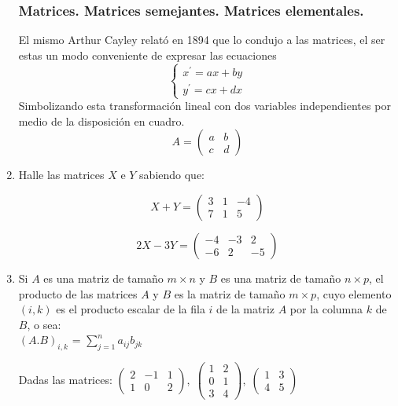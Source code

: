\begin{enumerate}
\subsubsection{Matrices. Matrices semejantes. Matrices elementales.}

 \bigskip
 
 El mismo Arthur Cayley relató en 1894 que lo condujo a las matrices, el ser estas un modo conveniente de expresar las ecuaciones
 \[
\left\{
\begin{array}{ll}
x^{\prime}= ax + by \\
y^{\prime}= cx + dx
\end{array}
\right.
\]
Simbolizando esta transformación lineal con dos variables independientes por medio de la disposición en cuadro.
\[A= \left(\begin{array}{cc}a & b   \\ c & d 
\end{array}
 \right)
 \]
 


\item

Halle las matrices $X$ e $Y$ sabiendo que:

 \[X+Y= \left(\begin{array}{ccc}3 & 1 & -4  \\ 7 & 1 & 5
\end{array}
 \right)
 \]
  
 \[2X - 3Y =  \left(\begin{array}{ccc}-4 & -3 & 2  \\ -6 & 2 & -5
\end{array}
 \right)
 \]
 
 \item
 
 Si $A$ es una matriz de tamaño $m \times n$ y $B$ es una matriz de tamaño $n \times p$,
 el producto de las matrices $A$ y $B$ es la matriz de tamaño  $m \times p$, cuyo elemento $(i,k)$  es el producto escalar de la fila $i$ de la matriz $A$ por la columna $k$ de $B$, o sea:\\
 
               $(A.B)_{i,k}$ =  $ \sum_{j=1}^n  a_{ij}b_{jk}$

 Dadas las matrices: $\left(\begin{array}{ccc}2 & -1 & 1  \\ 1 & 0 & 2
\end{array}
 \right)$,$~~\left(\begin{array}{cc}1 & 2   \\ 0 & 1 \\ 3 & 4
\end{array}
 \right)$,$~~\left(\begin{array}{cc}1 & 3   \\ 4 & 5
\end{array}
 \right)$
 

\end{enumerate}
